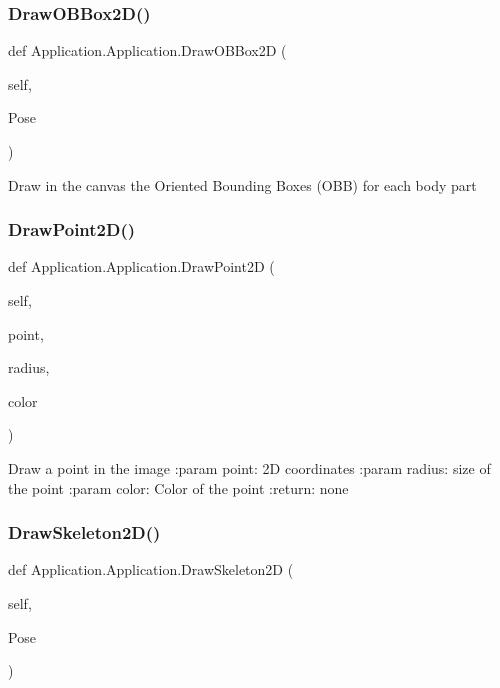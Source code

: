 \subsubsection{Draw\+O\+B\+Box2\+D()}
{\footnotesize\ttfamily def Application.\+Application.\+Draw\+O\+B\+Box2D (\begin{DoxyParamCaption}\item[{}]{self,  }\item[{}]{Pose }\end{DoxyParamCaption})}

\begin{DoxyVerb}Draw in the canvas the Oriented Bounding Boxes (OBB) for each body part
\end{DoxyVerb}
 \mbox{\label{class_application_1_1_application_a6564aeb78321ccf643be0b90fe2b388e}} 
\subsubsection{Draw\+Point2\+D()}
{\footnotesize\ttfamily def Application.\+Application.\+Draw\+Point2D (\begin{DoxyParamCaption}\item[{}]{self,  }\item[{}]{point,  }\item[{}]{radius,  }\item[{}]{color }\end{DoxyParamCaption})}

\begin{DoxyVerb}Draw a point in the image
:param point: 2D coordinates
:param radius: size of the point
:param color: Color of the point
:return: none
\end{DoxyVerb}
 \mbox{\label{class_application_1_1_application_af36ed2ae19b0450de779306b410dee6f}} 
\subsubsection{Draw\+Skeleton2\+D()}
{\footnotesize\ttfamily def Application.\+Application.\+Draw\+Skeleton2D (\begin{DoxyParamCaption}\item[{}]{self,  }\item[{}]{Pose }\end{DoxyParamCaption})}

